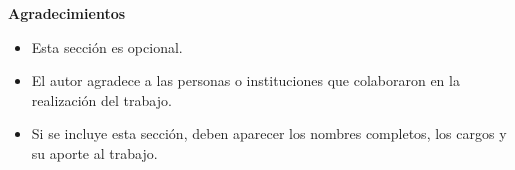 \begin{center}
\textbf{Agradecimientos}
\end{center}

\begin{itemize}[label=] %
    \item Esta sección es opcional.
    \item El autor agradece a las personas o instituciones que colaboraron en la realización del trabajo.
    \item Si se incluye esta sección, deben aparecer los nombres completos, los cargos y su aporte al trabajo.
\end{itemize}



